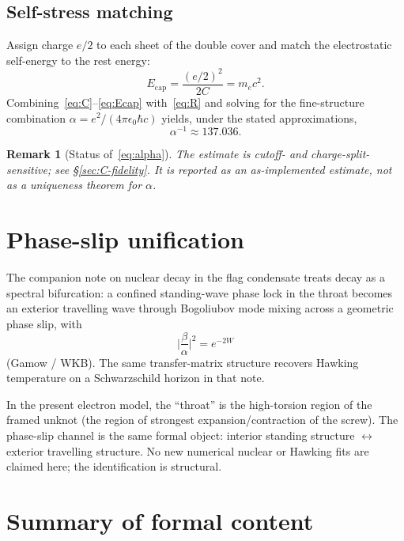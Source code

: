 \documentclass[11pt,a4paper]{article}
\newtheorem{remark}{Remark}
\begin{document}
\subsection{Self-stress matching}

Assign charge $e/2$ to each sheet of the double cover and match the
electrostatic self-energy to the rest energy:
\begin{equation}
\label{eq:Ecap}
E_{\mathrm{cap}}
=
\frac{(e/2)^2}{2C}
=
m_e c^2.
\end{equation}
Combining~\eqref{eq:C}--\eqref{eq:Ecap} with~\eqref{eq:R} and solving for
the fine-structure combination
$\alpha = e^2/(4\pi\epsilon_0\hbar c)$ yields, under the stated
approximations,
\begin{equation}
\label{eq:alpha}
\alpha^{-1} \approx 137.036.
\end{equation}

\begin{remark}[Status of~\eqref{eq:alpha}]
The estimate is cutoff- and charge-split-sensitive; see
\S\ref{sec:C-fidelity}.  It is reported as an as-implemented estimate,
not as a uniqueness theorem for $\alpha$.
\end{remark}

\section{Phase-slip unification}
\label{sec:phase-slip}

The companion note on nuclear decay in the flag condensate
\cite{flagdecay2026} treats decay as a spectral bifurcation: a confined
standing-wave phase lock in the throat becomes an exterior travelling
wave through Bogoliubov mode mixing across a geometric phase slip, with
\begin{equation}
\biggl|\frac{\beta}{\alpha}\biggr|^2 = e^{-2W}
\end{equation}
(Gamow / WKB).  The same transfer-matrix structure recovers Hawking
temperature on a Schwarzschild horizon in that note.

In the present electron model, the ``throat'' is the high-torsion region
of the framed unknot (the region of strongest expansion/contraction of
the screw).  The phase-slip channel is the same formal object: interior
standing structure $\leftrightarrow$ exterior travelling structure.
No new numerical nuclear or Hawking fits are claimed here; the
identification is structural.

\section{Summary of formal content}
\end{document}
